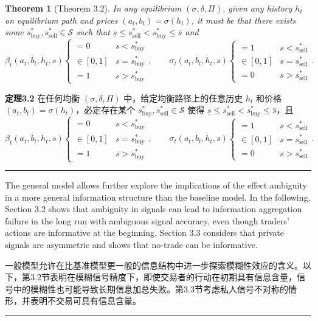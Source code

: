 \documentclass[12pt,a4paper]{article}
\newenvironment{original}{%
  \par\vspace{4pt}\noindent%
  \color{black}%
  \ignorespaces
}{%
  \par\vspace{2pt}%
}
\newenvironment{translation}{%
  \par\vspace{2pt}\noindent%
  \color{transblue}%
  \ignorespaces
}{%
  \par\vspace{4pt}\hrule\vspace{6pt}%
}
\newtheorem{theorem}{Theorem}[section]
\begin{document}
\begin{theorem}[Theorem 3.2]
In any equilibrium $(\sigma, \delta, \Pi)$, given any history $h_t$ on equilibrium path and prices $(a_t, b_t) = \sigma(h_t)$, it must be that there exists some $s^*_{\text{buy}}, s^*_{\text{sell}} \in \mathcal{S}$ such that $\underline{s} \leq s^*_{\text{sell}} < s^*_{\text{buy}} \leq \bar{s}$ and
\[
\beta_t(a_t, b_t, h_t, s) \begin{cases}
= 0 & s < s^*_{\text{buy}} \\
\in [0, 1] & s = s^*_{\text{buy}} \\
= 1 & s > s^*_{\text{buy}}
\end{cases},
\qquad
\sigma_t(a_t, b_t, h_t, s) \begin{cases}
= 1 & s < s^*_{\text{sell}} \\
\in [0, 1] & s = s^*_{\text{sell}} \\
= 0 & s > s^*_{\text{sell}}
\end{cases}.
\]
\end{theorem}
\begin{translation}
\textbf{定理3.2} 在任何均衡 $(\sigma, \delta, \Pi)$ 中，给定均衡路径上的任意历史 $h_t$ 和价格 $(a_t, b_t) = \sigma(h_t)$，必定存在某个 $s^*_{\text{buy}}, s^*_{\text{sell}} \in \mathcal{S}$ 使得 $\underline{s} \leq s^*_{\text{sell}} < s^*_{\text{buy}} \leq \bar{s}$，且
\[
\beta_t(a_t, b_t, h_t, s) \begin{cases}
= 0 & s < s^*_{\text{buy}} \\
\in [0, 1] & s = s^*_{\text{buy}} \\
= 1 & s > s^*_{\text{buy}}
\end{cases},
\qquad
\sigma_t(a_t, b_t, h_t, s) \begin{cases}
= 1 & s < s^*_{\text{sell}} \\
\in [0, 1] & s = s^*_{\text{sell}} \\
= 0 & s > s^*_{\text{sell}}
\end{cases}.
\]
\end{translation}

\begin{original}
The general model allows further explore the implications of the effect ambiguity in a more general information structure than the baseline model. In the following, Section 3.2 shows that ambiguity in signals can lead to information aggregation failure in the long run with ambiguous signal accuracy, even though traders' actions are informative at the beginning. Section 3.3 considers that private signals are asymmetric and shows that no-trade can be informative.
\end{original}
\begin{translation}
一般模型允许在比基准模型更一般的信息结构中进一步探索模糊性效应的含义。以下，第3.2节表明在模糊信号精度下，即使交易者的行动在初期具有信息含量，信号中的模糊性也可能导致长期信息加总失败。第3.3节考虑私人信号不对称的情形，并表明不交易可具有信息含量。
\end{translation}
\end{document}
